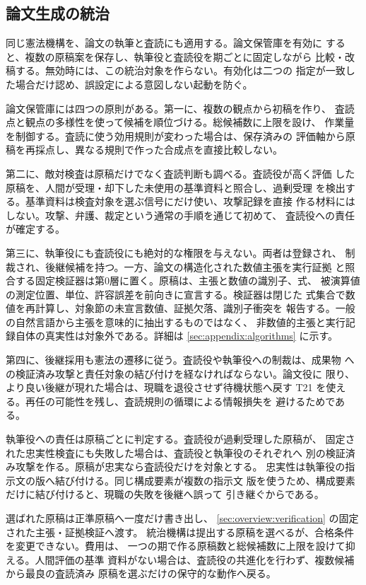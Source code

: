 \subsection{論文生成の統治}\label{sec:rqgm:paper}

同じ憲法機構を、論文の執筆と査読にも適用する。論文保管庫を有効に
すると、複数の原稿案を保存し、執筆役と査読役を期ごとに固定しながら
比較・改稿する。無効時には、この統治対象を作らない。有効化は二つの
指定が一致した場合だけ認め、誤設定による意図しない起動を防ぐ。

論文保管庫には四つの原則がある。第一に、複数の観点から初稿を作り、
査読点と観点の多様性を使って候補を順位づける。総候補数に上限を設け、
作業量を制御する。査読に使う効用規則が変わった場合は、保存済みの
評価軸から原稿を再採点し、異なる規則で作った合成点を直接比較しない。

第二に、敵対検査は原稿だけでなく査読判断も調べる。査読役が高く評価
した原稿を、人間が受理・却下した未使用の基準資料と照合し、過剰受理
を検出する。基準資料は検査対象を選ぶ信号にだけ使い、攻撃記録を直接
作る材料にはしない。攻撃、弁護、裁定という通常の手順を通じて初めて、
査読役への責任が確定する。

第三に、執筆役にも査読役にも絶対的な権限を与えない。両者は登録され、
制裁され、後継候補を持つ。一方、論文の構造化された数値主張を実行証拠
と照合する固定検証器は第0層に置く。原稿は、主張と数値の識別子、式、
被演算値の測定位置、単位、許容誤差を前向きに宣言する。検証器は閉じた
式集合で数値を再計算し、対象節の未宣言数値、証拠欠落、識別子衝突を
報告する。一般の自然言語から主張を意味的に抽出するものではなく、
非数値的主張と実行記録自体の真実性は対象外である。詳細は
\cref{sec:appendix:algorithms} に示す。

第四に、後継採用も憲法の遷移に従う。査読役や執筆役への制裁は、成果物
への検証済み攻撃と責任対象の結び付けを経なければならない。論文役に
限り、より良い後継が現れた場合は、現職を退役させず待機状態へ戻す
T21 を使える。再任の可能性を残し、査読規則の循環による情報損失を
避けるためである。

執筆役への責任は原稿ごとに判定する。査読役が過剰受理した原稿が、
固定された忠実性検査にも失敗した場合は、査読役と執筆役のそれぞれへ
別の検証済み攻撃を作る。原稿が忠実なら査読役だけを対象とする。
忠実性は執筆役の指示文の版へ結び付ける。同じ構成要素が複数の指示文
版を使うため、構成要素だけに結び付けると、現職の失敗を後継へ誤って
引き継ぐからである。

選ばれた原稿は正準原稿へ一度だけ書き出し、
\cref{sec:overview:verification} の固定された主張・証拠検証へ渡す。
統治機構は提出する原稿を選べるが、合格条件を変更できない。費用は、
一つの期で作る原稿数と総候補数に上限を設けて抑える。人間評価の基準
資料がない場合は、査読役の共進化を行わず、複数候補から最良の査読済み
原稿を選ぶだけの保守的な動作へ戻る。

